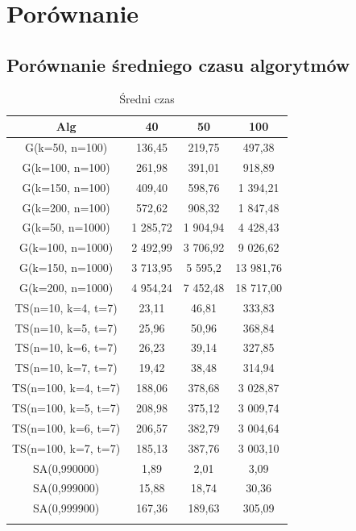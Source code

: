 \documentclass[wide,a4paper,titlepage,12pt] {article}
\begin{document}
\newpage
\section{Porównanie}
\paragraph{} %
\label{par:}
\subsection{Porównanie średniego czasu algorytmów}
\begin{center}
    \begin{longtable}{|c|c|c|c|}
        \hline
        Alg & 40 & 50 & 100 \\ \hline
        G(k=50, n=100) & 136,45 & 219,75 & 497,38\\ \hline
        G(k=100, n=100)& 261,98 & 391,01 & 918,89\\ \hline
        G(k=150, n=100)& 409,40 &  598,76 & 1 394,21\\ \hline
        G(k=200, n=100)& 572,62 & 908,32 & 1 847,48\\ \hline
        G(k=50, n=1000)& 1 285,72& 1 904,94& 4 428,43\\ \hline
        G(k=100, n=1000)  &  2 492,99 &3 706,92& 9 026,62\\ \hline
        G(k=150, n=1000)   & 3 713,95 &5 595,2  &13 981,76\\ \hline
        G(k=200, n=1000)   & 4 954,24& 7 452,48& 18 717,00\\ \hline
        TS(n=10, k=4, t=7) & 23,11 &  46,81 &  333,83\\ \hline
        TS(n=10, k=5, t=7) & 25,96 &  50,96 &  368,84\\ \hline
        TS(n=10, k=6, t=7) & 26,23 &  39,14 &  327,85\\ \hline
        TS(n=10, k=7, t=7) & 19,42  & 38,48  & 314,94\\ \hline
        TS(n=100, k=4, t=7)& 188,06 & 378,68 & 3 028,87\\ \hline
        TS(n=100, k=5, t=7)& 208,98 & 375,12 & 3 009,74\\ \hline
        TS(n=100, k=6, t=7)& 206,57 & 382,79 & 3 004,64\\ \hline
        TS(n=100, k=7, t=7) &185,13  &387,76 & 3 003,10\\ \hline
        SA(0,990000)  &  1,89  &  2,01 &   3,09\\ \hline
        SA(0,999000)  &  15,88 &  18,74 &  30,36\\ \hline
        SA(0,999900)  &  167,36 & 189,63 & 305,09\\ \hline
                \caption{Średni czas}
    \end{longtable}

\end{center}
\end{document}
